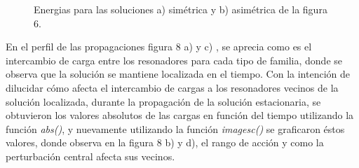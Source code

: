 \documentclass[11pt,letterpaper,twocolumn]{article}
\begin{document}
\begin{figure}[h!]
\centering
{} 
\caption{Energias para las soluciones a) simétrica y b) asimétrica de la figura 6.}
\end{figure}
\par 
En el perfil de las propagaciones figura $8$ a) y c) , se aprecia como es el intercambio de carga entre los resonadores para cada tipo de familia, donde se observa que la solución se mantiene localizada en el tiempo. Con la intención de dilucidar cómo afecta el intercambio de cargas a los resonadores vecinos de la solución localizada,  durante la propagación de la solución estacionaria, se obtuvieron los valores absolutos de las cargas en función del tiempo utilizando la función \textit{abs()}, y nuevamente utilizando la función \textit{imagesc()} se graficaron éstos valores, donde observa en la figura $8$ b) y d), el rango de acción y como la perturbación central afecta sus vecinos.\\
\end{document}
